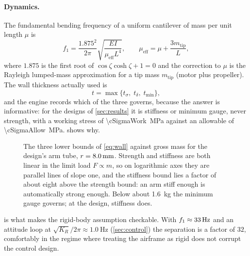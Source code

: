 \paragraph{Dynamics.} The fundamental bending frequency of a uniform cantilever
of mass per unit length $\mu$ is
\begin{equation}
  f_1 = \frac{1.875^2}{2\pi}\sqrt{\frac{EI}{\mu_{\mathrm{eff}} L^4}},
  \qquad
  \mu_{\mathrm{eff}} = \mu + \frac{3 m_{\mathrm{tip}}}{L} ,
  \label{eq:freq}
\end{equation}
where $1.875$ is the first root of $\cos\zeta\cosh\zeta+1=0$ and the correction
to $\mu$ is the Rayleigh lumped-mass approximation for a tip mass
$m_{\mathrm{tip}}$ (motor plus propeller). The wall thickness actually used is
\begin{equation}
  t = \max\{t_\sigma,\; t_\delta,\; t_{\min}\} ,
  \label{eq:wall}
\end{equation}
and the engine records which of the three governs, because the answer is
informative: for the designs of \cref{sec:results} it is stiffness or minimum
gauge, never strength, with a working stress of \SI{\cSigmaWork}{\mega\pascal}
against an allowable of \SI{\cSigmaAllow}{\mega\pascal}.  shows
why.

\begin{figure}[tbp]
\centering

\caption{The three lower bounds of \cref{eq:wall} against gross mass for the
design's arm tube, $r=\SI{8.0}{\milli\metre}$. Strength and stiffness are
both linear in the limit load $F\propto m$, so on logarithmic axes they are
parallel lines of slope one, and the stiffness bound lies a factor of about
eight above the strength bound: an arm stiff enough is automatically strong
enough. Below about \SI{1.6}{\kilo\gram} the minimum gauge governs; at the
design, stiffness does.}
\label{fig:wall}
\end{figure}

\begin{remark}
 is what makes the rigid-body assumption checkable. With
$f_1\approx\SI{33}{\hertz}$ and an attitude loop at
$\sqrt{K_R}/2\pi\approx\SI{1.0}{\hertz}$ (\cref{sec:control}) the separation is
a factor of $32$, comfortably in the regime where treating the airframe as rigid
does not corrupt the control design.
\end{remark}

